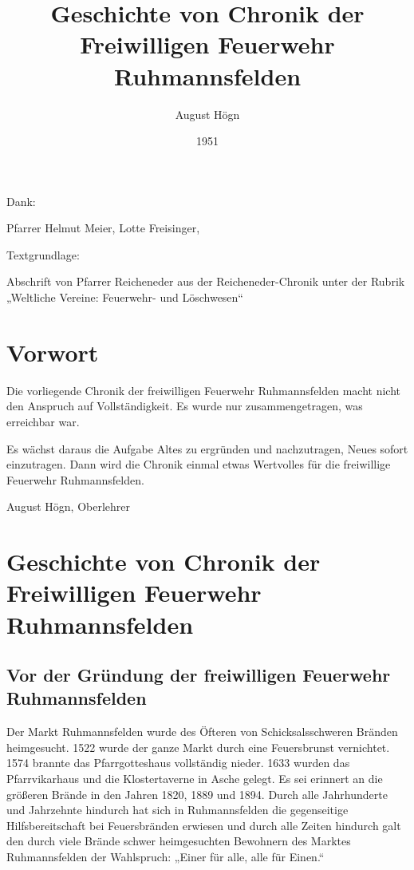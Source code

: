 \documentclass[12pt,a4paper]{book}
\author{August Högn}
\title{Geschichte von Chronik der Freiwilligen Feuerwehr Ruhmannsfelden}
\date{1951}
\begin{document}
\maketitle

\begin{ersteseite}
Dank:

\bigskip

Pfarrer Helmut Meier, Lotte Freisinger,

\bigskip

Textgrundlage:

\bigskip

Abschrift von Pfarrer Reicheneder aus der Reicheneder-Chronik unter der
Rubrik „Weltliche Vereine: Feuerwehr- und Löschwesen“
\end{ersteseite}

\tableofcontents

\part{Vorwort}

Die vorliegende Chronik der freiwilligen Feuerwehr Ruhmannsfelden macht
nicht den Anspruch auf Vollständigkeit. Es wurde nur zusammengetragen,
was erreichbar war.

Es wächst daraus die Aufgabe Altes zu ergründen und nachzutragen, Neues
sofort einzutragen. Dann wird die Chronik einmal etwas Wertvolles für
die freiwillige Feuerwehr Ruhmannsfelden.

August Högn, Oberlehrer

\part[Geschichte von Chronik der Feuerwehr]{Geschichte von Chronik der
Freiwilligen Feuerwehr Ruhmannsfelden}

\chapter{Vor der Gründung der freiwilligen Feuerwehr Ruhmannsfelden}

Der Markt Ruhmannsfelden wurde des Öfteren von Schicksalsschweren
Bränden heimgesucht. 1522 wurde der ganze Markt durch eine Feuersbrunst
vernichtet. 1574 brannte das Pfarrgotteshaus vollständig nieder. 1633
wurden das Pfarrvikarhaus und die Klostertaverne in Asche gelegt. Es sei
erinnert an die größeren Brände in den Jahren 1820, 1889 und 1894. Durch
alle Jahrhunderte und Jahrzehnte hindurch hat sich in Ruhmannsfelden die
gegenseitige Hilfsbereitschaft bei Feuersbränden erwiesen und durch alle
Zeiten hindurch galt den durch viele Brände schwer heimgesuchten
Bewohnern des Marktes Ruhmannsfelden der Wahlspruch: „Einer für alle,
alle für Einen.“
\end{document}

